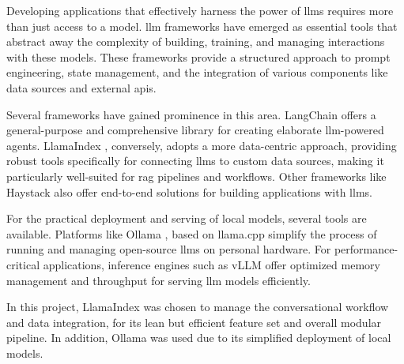 Developing applications that effectively harness the power of \acp{llm} requires more than just access to a model. \Ac{llm} frameworks have emerged as essential tools that abstract away the complexity of building, training, and managing interactions with these models. These frameworks provide a structured approach to prompt engineering, state management, and the integration of various components like data sources and external \acp{api}.

Several frameworks have gained prominence in this area. LangChain \cite{LANGCHAIN} offers a general-purpose and comprehensive library for creating elaborate \ac{llm}-powered agents. LlamaIndex \cite{LLAMAINDEX}, conversely, adopts a more data-centric approach, providing robust tools specifically for connecting \acp{llm} to custom data sources, making it particularly well-suited for \ac{rag} pipelines and workflows. Other frameworks like Haystack \cite{HAYSTACK} also offer end-to-end solutions for building applications with \acp{llm}.

For the practical deployment and serving of local models, several tools are available. Platforms like Ollama \cite{OLLAMA}, based on llama.cpp \cite{LLAMA-CPP} simplify the process of running and managing open-source \acp{llm} on personal hardware. For performance-critical applications, inference engines such as vLLM \cite{VLLM} offer optimized memory management and throughput for serving \ac{llm} models efficiently.

In this project, LlamaIndex was chosen to manage the conversational workflow and data integration, for its lean but efficient feature set and overall modular pipeline. In addition, Ollama was used due to its simplified deployment of local models.